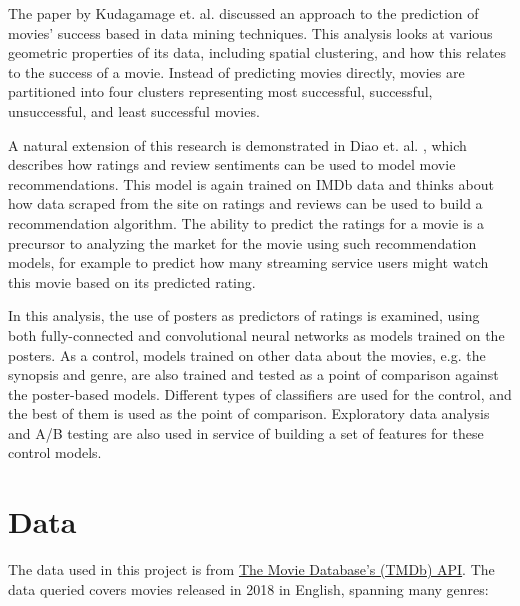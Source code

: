 \documentclass[12pt, oneside]{article}   	%
\begin{document}
The paper by Kudagamage et. al. \cite{kudagamage_data_2018} discussed an approach to the prediction of movies' success based in data mining techniques. This analysis looks at various geometric properties of its data, including spatial clustering, and how this relates to the success of a movie. Instead of predicting movies directly, movies are partitioned into four clusters representing most successful, successful, unsuccessful, and least successful movies. 

A natural extension of this research is demonstrated in Diao et. al. \cite{diao_jointly_2014}, which describes how ratings and review sentiments can be used to model movie recommendations. This model is again trained on IMDb data and thinks about how data scraped from the site on ratings and reviews can be used to build a recommendation algorithm. The ability to predict the ratings for a movie is a precursor to analyzing the market for the movie using such recommendation models, for example to predict how many streaming service users might watch this movie based on its predicted rating. 

In this analysis, the use of posters as predictors of ratings is examined, using both fully-connected and convolutional neural networks as models trained on the posters. As a control, models trained on other data about the movies, e.g. the synopsis and genre, are also trained and tested as a point of comparison against the poster-based models. Different types of classifiers are used for the control, and the best of them is used as the point of comparison. Exploratory data analysis and A/B testing are also used in service of building a set of features for these control models.

\section{Data}

The data used in this project is from \href{https://api.tmdb.org}{The Movie Database's (TMDb) API}. The data queried covers movies released in 2018 in English, spanning many genres: 
\end{document}
